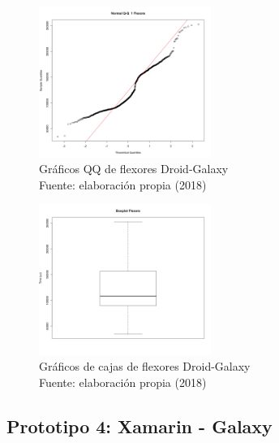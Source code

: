 \begin{figure}[H]
  \begin{center} 
   	\includegraphics[width=0.5\textwidth]{evaluation/graphics/Droid/Galaxy/NormalQQFlexorsDroidGalaxy.png} 
    \caption[Gráfico QQ de flexores Droid-Galaxy]{Gráficos QQ de flexores Droid-Galaxy\\Fuente: elaboración propia (2018)} 
    \label{fig:droid-galaxy-QQ-flexors}
  \end{center}
\end{figure}

\begin{figure}[H]
  \begin{center} 
   	\includegraphics[width=0.5\textwidth]{evaluation/graphics/Droid/Galaxy/BoxplotFlexorsDroidGalaxy.png} 
    \caption[Gráficos de cajas de flexores Droid-Galaxy]{Gráficos de cajas de flexores Droid-Galaxy\\Fuente: elaboración propia (2018)} 
    \label{fig:droid-galaxy-boxplot-flexors}
  \end{center}
\end{figure}





\subsection{Prototipo 4: Xamarin - Galaxy}

